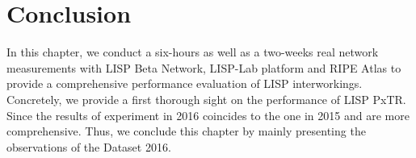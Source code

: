 \section{Conclusion}
\label{sec:pxtr_conclusion}
In this chapter, we conduct a six-hours as well as a two-weeks real network measurements with LISP Beta Network, LISP-Lab platform and RIPE Atlas to provide a comprehensive performance evaluation of LISP interworkings. Concretely, we provide a first thorough sight on the performance of LISP PxTR. Since the results of experiment in 2016 coincides to the one in 2015 and are more comprehensive. Thus, we conclude this chapter by mainly presenting the observations of the Dataset 2016. 

